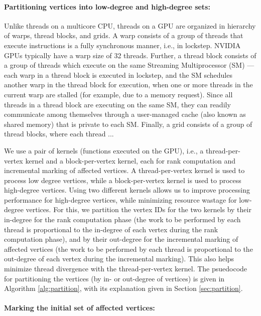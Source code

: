 \paragraph{Partitioning vertices into low-degree and high-degree sets:}

Unlike threads on a multicore CPU, threads on a GPU are organized in hierarchy of warps, thread blocks, and grids. A warp consists of a group of threads that execute instructions is a fully synchronous manner, i.e., in lockstep. NVIDIA GPUs typically have a warp size of 32 threads. Further, a thread block consists of a group of threads which execute on the same Streaming Multiprocessor (SM) --- each warp in a thread block is executed in lockstep, and the SM schedules another warp in the thread block for execution, when one or more threads in the current warp are stalled (for example, due to a memory request). Since all threads in a thread block are executing on the same SM, they can readily communicate among themselves through a user-managed cache (also known as shared memory) that is private to each SM. Finally, a grid consists of a group of thread blocks, where each thread ...

We use a pair of kernels (functions executed on the GPU), i.e., a thread-per-vertex kernel and a block-per-vertex kernel, each for rank computation and incremental marking of affected vertices. A thread-per-vertex kernel is used to process low degree vertices, while a block-per-vertex kernel is used to process high-degree vertices. Using two different kernels allows us to improve processing performance for high-degree vertices, while minimizing resource wastage for low-degree vertices. For this, we partition the vertex IDs for the two kernels by their in-degree for the rank computation phase (the work to be performed by each thread is proportional to the in-degree of each vertex during the rank computation phase), and by their out-degree for the incremental marking of affected vertices (the work to be performed by each thread is proportional to the out-degree of each vertex during the incremental marking). This also helps minimize thread divergence with the thread-per-vertex kernel. The psuedocode for partitioning the vertices (by in- or out-degree of vertices) is given in Algorithm \ref{alg:partition}, with its explanation given in Section \ref{sec:partition}.

\paragraph{Marking the initial set of affected vertices:}

